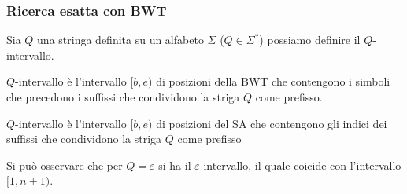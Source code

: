 \subsubsection{Ricerca esatta con BWT}
Sia $Q$ una stringa definita su un alfabeto $\Sigma$ ($Q\in \Sigma^\ast$) possiamo
definire il $Q$-intervallo.
\begin{definizione} 
    $Q$-intervallo è l'intervallo $[b,e)$ di posizioni della BWT che contengono
    i simboli che precedono i suffissi che condividono la striga $Q$ come prefisso.
\end{definizione}
\begin{definizione} 
    $Q$-intervallo è l'intervallo $[b,e)$ di posizioni del SA che contengono
    gli indici dei suffissi che condividono la striga $Q$ come prefisso
\end{definizione}
Si può osservare che per $Q = \varepsilon$ si ha il $\varepsilon$-intervallo,
il quale coicide con l'intervallo $[1,n+1)$.
